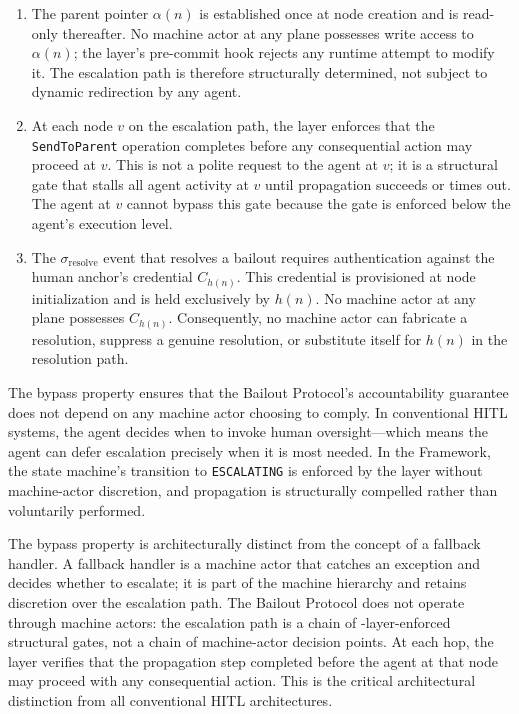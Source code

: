 \begin{enumerate}
\item[\textbf{Immutable parent pointer (Invariant I2).}] The parent pointer $\alpha(n)$ is established once at node creation and is read-only thereafter. No machine actor at any plane possesses write access to $\alpha(n)$; the \fact{} layer's pre-commit hook rejects any runtime attempt to modify it. The escalation path is therefore structurally determined, not subject to dynamic redirection by any agent.

\item[\textbf{Pre-commit enforcement at each hop.}] At each node $v$ on the escalation path, the \fact{} layer enforces that the \texttt{SendToParent} operation completes before any consequential action may proceed at $v$. This is not a polite request to the agent at $v$; it is a structural gate that stalls all agent activity at $v$ until propagation succeeds or times out. The agent at $v$ cannot bypass this gate because the gate is enforced below the agent's execution level.

\item[\textbf{Credential binding on $\sigma_{\text{resolve}}$.}] The $\sigma_{\text{resolve}}$ event that resolves a bailout requires authentication against the human anchor's credential $C_{h(n)}$. This credential is provisioned at node initialization and is held exclusively by $h(n)$. No machine actor at any plane possesses $C_{h(n)}$. Consequently, no machine actor can fabricate a resolution, suppress a genuine resolution, or substitute itself for $h(n)$ in the resolution path.
\end{enumerate}

The bypass property ensures that the Bailout Protocol's accountability guarantee does not depend on any machine actor choosing to comply. In conventional HITL systems, the agent decides when to invoke human oversight---which means the agent can defer escalation precisely when it is most needed. In the \bxthree{} Framework, the state machine's transition to \texttt{ESCALATING} is enforced by the \fact{} layer without machine-actor discretion, and propagation is structurally compelled rather than voluntarily performed.

The bypass property is architecturally distinct from the concept of a fallback handler. A fallback handler is a machine actor that catches an exception and decides whether to escalate; it is part of the machine hierarchy and retains discretion over the escalation path. The Bailout Protocol does not operate through machine actors: the escalation path is a chain of \fact{}-layer-enforced structural gates, not a chain of machine-actor decision points. At each hop, the \fact{} layer verifies that the propagation step completed before the agent at that node may proceed with any consequential action. This is the critical architectural distinction from all conventional HITL architectures.

